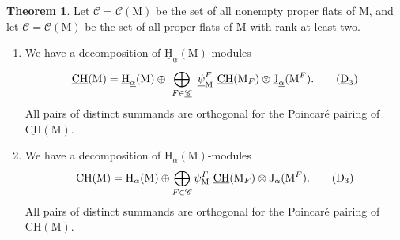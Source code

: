 \documentclass[11pt,reqno]{amsart}
\theoremstyle{definition}
\newtheorem{theorem}{Theorem}[section]
\theoremstyle{remark}
\renewcommand{\H}{\operatorname{H}}
\renewcommand{\(}{\left(}
\renewcommand{\)}{\right)}
\newcommand{\<}{\left<}
\renewcommand{\>}{\right>}
\newcommand{\uJ}{\underline{\operatorname{J}}}
\newcommand{\CH}{\operatorname{CH}}
\newcommand{\uCH}{\underline{\CH}}
\begin{document}
\begin{theorem}\label{TheoremSimplexDecomposition}
Let $\mathscr{C} = \mathscr{C}(\mathrm{M})$ be the set of all nonempty proper flats of $\mathrm{M}$, and let $\underline{\mathscr{C}} = \underline{\mathscr{C}}(\mathrm{M})$ be the set of all proper flats of $\mathrm{M}$ with rank at least two. 
\begin{enumerate}[(1)]\itemsep 5pt
\item We have a decomposition of $\underline{\mathrm{H}}_{\underline{\alpha}}(\mathrm{M})$-modules
\begin{equation}\label{underlinedalphadecomposition}
\underline{\CH}(\mathrm{M}) = \underline{\mathrm{H}}_{\underline{\alpha}}(\mathrm{M}) \oplus \ \bigoplus_{F \in \underline{\mathscr{C}}}  \ \underline{\psi}^F_\mathrm{M}\ \uCH(\mathrm{M}_F)\otimes \uJ_{\underline{\alpha}}(\mathrm{M}^F). \tag{$\underline{\mathrm{D}}_3$}
\end{equation}
All pairs of distinct summands are orthogonal for the Poincar\'e pairing of $\underline{\mathrm{CH}}(\mathrm{M})$.
\item We have a decomposition of $\mathrm{H}_\alpha(\mathrm{M})$-modules
\begin{equation}\label{alphadecomposition}
\CH(\mathrm{M}) = \H_\alpha(\mathrm{M}) \oplus \bigoplus_{F \in \mathscr{C}}  \psi^F_\mathrm{M} \ \uCH(\mathrm{M}_F)\otimes {\mathrm{J}}_\alpha(\mathrm{M}^F). \tag{$\mathrm{D}_3$}
\end{equation}
All pairs of distinct summands are orthogonal for the Poincar\'e pairing of $\mathrm{CH}(\mathrm{M})$.
\end{enumerate}
\end{theorem}
\end{document}
